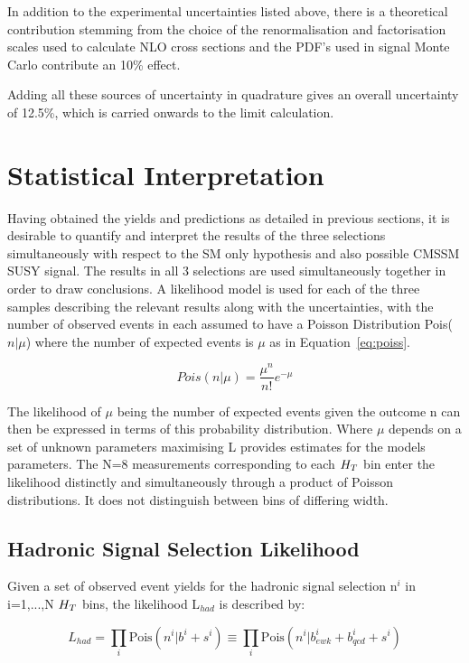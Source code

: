 In addition to the experimental uncertainties listed above, there is a theoretical contribution stemming from the choice of the renormalisation and factorisation scales used to calculate NLO cross sections and the PDF's used in signal Monte Carlo contribute an 10\% effect. 

Adding all these sources of uncertainty in quadrature gives an overall uncertainty of 12.5\%, which is carried onwards to the limit calculation. 

\section{Statistical Interpretation}

Having obtained the yields and predictions as detailed in previous sections, it is desirable to quantify and interpret the results of the three selections simultaneously with respect to the SM only hypothesis and also possible CMSSM SUSY signal. The results in all 3 selections are used simultaneously together in order to draw conclusions. A likelihood model is used for each of the three samples describing the relevant results along with the uncertainties, with the number of observed events in each assumed to have a Poisson Distribution Pois($n | \mu$) where the number of expected events is $\mu$ as in Equation~\ref{eq:poiss}.

\begin{equation}
Pois(n | \mu)  = \frac{\mu^{n}}{n!} e^{-\mu}
\label{eq:poiss} 
\end{equation}

The likelihood of $\mu$ being the number of expected events given the outcome n can then be expressed in terms of this probability distribution. Where $\mu$ depends on a set of unknown parameters maximising L provides estimates for the models parameters. The N=8 measurements corresponding to each $H_{T} $ bin enter the likelihood distinctly and simultaneously through a product of Poisson distributions. It does not distinguish between bins of differing width. 

\subsection{Hadronic Signal Selection Likelihood}

Given a set of observed event yields for the hadronic signal selection n$^{i}$ in i=1,...,N $ H_{T} $ bins, the likelihood L$_{had}$ is described by:

\begin{equation}
L_{had} = \prod_{i} \textrm{Pois}(n^{i}|b^{i} + s^{i}) \equiv \prod_{i} \textrm{Pois}(n^{i} | b^{i}_{ewk} + b^{i}_{qcd} + s^{i})
\label{eq:Lhad1}
\end{equation}

